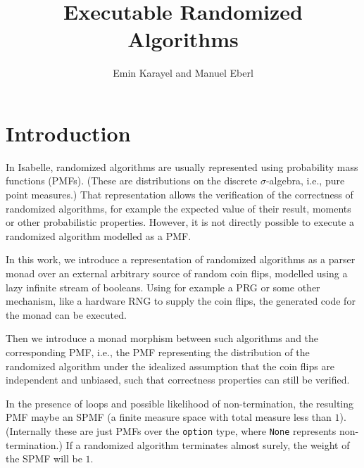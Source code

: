 \documentclass[11pt,a4paper]{article}
\begin{document}
\title{Executable Randomized Algorithms}
\author{Emin Karayel and Manuel Eberl}
\maketitle


\tableofcontents

\section{Introduction}
In Isabelle, randomized algorithms are usually represented using probability mass functions (PMFs). 
(These are distributions on the discrete $\sigma$-algebra, i.e., pure point measures.) That 
representation allows the verification of the correctness of randomized algorithms, for example
the expected value of their result, moments or other probabilistic properties. However, it is not 
directly possible to execute a randomized algorithm modelled as a PMF.

In this work, we introduce a representation of randomized algorithms as a parser monad over an 
external arbitrary source of random coin flips, modelled using a lazy infinite stream of booleans.
Using for example a PRG or some other mechanism, like a hardware RNG to supply the coin flips, the
generated code for the monad can be executed.

Then we introduce a monad morphism between such algorithms and the corresponding PMF, i.e., the PMF
representing the distribution of the randomized algorithm under the idealized assumption that the 
coin flips are independent and unbiased, such that correctness properties can still be verified.

In the presence of loops and possible likelihood of non-termination, the resulting PMF maybe an
SPMF (a finite measure space with total measure less than $1$). (Internally these are just PMFs over
the \verb+option+ type, where \verb+None+ represents non-termination.) If a randomized algorithm 
terminates almost surely, the weight of the SPMF will be $1$.
\end{document}
